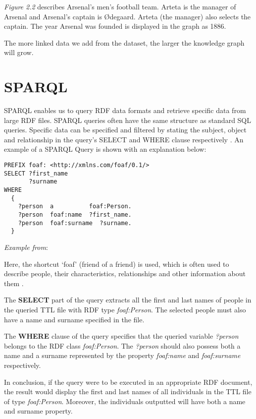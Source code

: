 \textit{Figure 2.2} describes Arsenal's men's football team. Arteta is the manager of Arsenal and Arsenal's captain is Ødegaard. Arteta (the manager) also selects the captain. The year Arsenal was founded is displayed in the graph as 1886.

The more linked data we add from the dataset, the larger the knowledge graph will grow.

\section{SPARQL}
\hspace{0.5cm} SPARQL enables us to query RDF data formats and retrieve specific data from large RDF files. SPARQL queries often have the same structure as standard SQL queries. Specific data can be specified and filtered by stating the subject, object and relationship in the query's SELECT and WHERE clause respectively \cite{sparlbook}. An example of a SPARQL Query is shown with an explanation below:

\begin{lstlisting}
PREFIX foaf: <http://xmlns.com/foaf/0.1/>
SELECT ?first_name 
       ?surname
WHERE
  {
    ?person  a          foaf:Person.
    ?person  foaf:name  ?first_name.
    ?person  foaf:surname  ?surname.
  }
\end{lstlisting}
\textit{Example from}: \cite{foaf}

\medskip
Here, the shortcut `foaf' (friend of a friend) is used, which is often used to describe people, their characteristics, relationships and other information about them \cite{foaf}.

The \textbf{SELECT} part of the query extracts all the first and last names of people in the queried TTL file with RDF type \textit{foaf:Person}. The selected people must also have a name and surname specified in the file.

The \textbf{WHERE} clause of the query specifies that the queried variable \textit{?person} belongs to the RDF class \textit{foaf:Person}. The \textit{?person} should also possess both a name and a surname represented by the property \textit{foaf:name} and \textit{foaf:surname} respectively.

In conclusion, if the query were to be executed in an appropriate RDF document, the result would display the first and last names of all individuals in the TTL file of type \textit{foaf:Person}. Moreover, the individuals outputted will have both a name and surname property.
